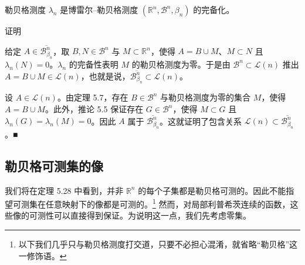 \begin{theorem}

勒贝格测度 $ \lambda_n $ 是博雷尔–勒贝格测度 $ (\mathbb{R}^n, \mathcal{B}^n, \beta_n) $ 的完备化。

证明

\begin{subitems}
\item

给定 $ A \in \overline{\mathcal{B}^n_{\beta_n}} $，取 $ B, N \in \mathcal{B}^n $ 与 $ M \subset \mathbb{R}^n $，使得 $ A = B \cup M $、$ M \subset N $ 且 $ \lambda_n(N) = 0 $。$ \lambda_n $ 的完备性表明 $ M $ 的勒贝格测度为零。于是由 $ \mathcal{B}^n \subset \mathcal{L}(n) $ 推出 $ A = B \cup M \in \mathcal{L}(n) $，也就是说，$ \overline{\mathcal{B}^n_{\beta_n}} \subset \mathcal{L}(n) $。

\item

设 $ A \in \mathcal{L}(n) $。由定理 5.7，存在 $ B \in \mathcal{B}^n $ 与勒贝格测度为零的集合 $ M $，使得 $ A = B \cup M $。此外，推论 5.5 保证存在 $ G \in \mathcal{B}^n $，使得 $ M \subset G $ 且 $ \lambda_n(G) = \lambda_n(M) = 0 $。因此 $ A $ 属于 $ \overline{\mathcal{B}^n_{\beta_n}} $。这就证明了包含关系 $ \mathcal{L}(n) \subset \overline{\mathcal{B}^n_{\beta_n}} $。\nobreak\hspace{0.35em}■

\end{subitems}

\end{theorem}

\subsection*{勒贝格可测集的像}

我们将在定理 5.28 中看到，并非 $ \mathbb{R}^n $ 的每个子集都是勒贝格可测的。因此不能指望可测集在任意映射下的像都是可测的。\footnote{以下我们几乎只与勒贝格测度打交道，只要不必担心混淆，就省略“勒贝格”这一修饰语。} 然而，对局部利普希茨连续的函数，这些像的可测性可以直接得到保证。为说明这一点，我们先考虑零集。

